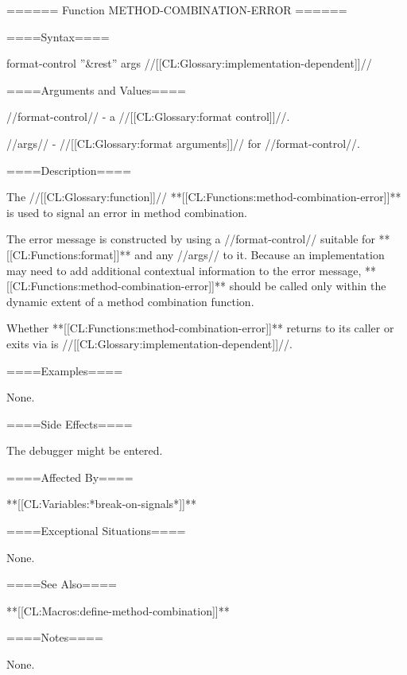 ====== Function METHOD-COMBINATION-ERROR ======

====Syntax====

 {format-control ''&rest'' args} {//[[CL:Glossary:implementation-dependent]]//}

====Arguments and Values====


//format-control// - a //[[CL:Glossary:format control]]//.


//args// - //[[CL:Glossary:format arguments]]// for //format-control//.

====Description====

The //[[CL:Glossary:function]]// **[[CL:Functions:method-combination-error]]** is used to signal an error in method combination.

The error message is constructed by using a //format-control// suitable for **[[CL:Functions:format]]** and any //args// to it. Because an implementation may need to add additional contextual information to the error message, **[[CL:Functions:method-combination-error]]** should be called only within the dynamic extent of a method combination function.


Whether **[[CL:Functions:method-combination-error]]** returns to its caller or exits via  is //[[CL:Glossary:implementation-dependent]]//.

====Examples====

None.

====Side Effects====

The debugger might be entered.

====Affected By====

**[[CL:Variables:*break-on-signals*]]**

====Exceptional Situations====

None.

====See Also====

**[[CL:Macros:define-method-combination]]**


====Notes====

None.


